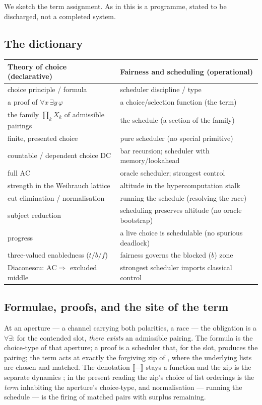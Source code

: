 \documentclass[11pt]{article}
\theoremstyle{definition}
\theoremstyle{plain}
\theoremstyle{remark}
\newcommand{\sem}[1]{\llbracket #1 \rrbracket}
\newcommand{\AC}{\mathrm{AC}}
\newcommand{\DC}{\mathrm{DC}}
\begin{document}
We sketch the term assignment. As in \cite{consensus} this is a programme, stated to be discharged, not
a completed system.

\subsection{The dictionary}

\begin{center}
\renewcommand{\arraystretch}{1.25}
\begin{tabular}{>{\raggedright}p{} >{\raggedright\arraybackslash}p{}}
\textbf{Theory of choice (declarative)} & \textbf{Fairness and scheduling (operational)}\\[2pt]
\hline
choice principle / formula & scheduler discipline / type\\
a proof of $\forall x\,\exists y\,\varphi$ & a choice/selection function (the term)\\
the family $\prod_k X_k$ of admissible pairings & the schedule (a section of the family)\\
finite, presented choice & pure scheduler (no special primitive)\\
countable / dependent choice $\DC$ & bar recursion; scheduler with memory/lookahead\\
full $\AC$ & oracle scheduler; strongest control\\
strength in the Weihrauch lattice & altitude in the hypercomputation stalk \cite{agency}\\
cut elimination / normalisation & running the schedule (resolving the race)\\
subject reduction & scheduling preserves altitude (no oracle bootstrap)\\
progress & a live choice is schedulable (no spurious deadlock)\\
three-valued enabledness ($t/b/f$) & fairness governs the blocked ($b$) zone\\
Diaconescu: $\AC \Rightarrow$ excluded middle & strongest scheduler imports classical control\\
\hline
\end{tabular}
\end{center}

\subsection{Formulae, proofs, and the site of the term}

At an aperture --- a channel carrying both polarities, a race --- the obligation is a $\forall\exists$:
for the contended slot, \emph{there exists} an admissible pairing. The formula is the choice-type of that
aperture; a proof is a scheduler that, for the slot, produces the pairing; the term acts at exactly the
forgiving zip of \cite{qcs}, where the underlying lists are chosen and matched. The denotation $\sem{-}$
stays a function and the zip is the separate dynamics \cite{qcs}; in the present reading the zip's choice
of list orderings is the \emph{term} inhabiting the aperture's choice-type, and normalisation --- running
the schedule --- is the firing of matched pairs with surplus remaining.
\end{document}
